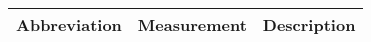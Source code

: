 
\begin{tabular}{lll}
\hline
\textbf{Abbreviation} & \textbf{Measurement} & \textbf{Description}\\
\hline
\hline
\end{tabular}